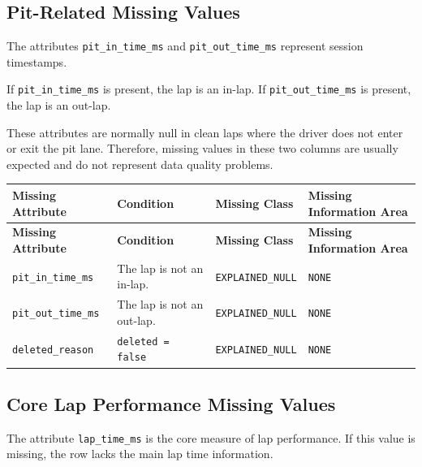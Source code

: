 \documentclass[a4paper,11pt]{article}
\begin{document}
	\subsection{Pit-Related Missing Values}
	
	The attributes \texttt{pit\_in\_time\_ms} and \texttt{pit\_out\_time\_ms} represent session timestamps.
	
	If \texttt{pit\_in\_time\_ms} is present, the lap is an in-lap.
	If \texttt{pit\_out\_time\_ms} is present, the lap is an out-lap.
	
	These attributes are normally null in clean laps where the driver does not enter or exit the pit lane.
	Therefore, missing values in these two columns are usually expected and do not represent data quality problems.
	
	\begin{longtable}{p{4cm}p{4.5cm}p{3.5cm}p{4cm}}
		\toprule
		\textbf{Missing Attribute} & \textbf{Condition} & \textbf{Missing Class} & \textbf{Missing Information Area} \\
		\midrule
		\endfirsthead
		
		\toprule
		\textbf{Missing Attribute} & \textbf{Condition} & \textbf{Missing Class} & \textbf{Missing Information Area} \\
		\midrule
		\endhead
		
		\texttt{pit\_in\_time\_ms}
		& The lap is not an in-lap.
		& \texttt{EXPLAINED\_NULL}
		& \texttt{NONE} \\
		\midrule
		
		\texttt{pit\_out\_time\_ms}
		& The lap is not an out-lap.
		& \texttt{EXPLAINED\_NULL}
		& \texttt{NONE} \\
		\midrule
		
		\texttt{deleted\_reason}
		& \texttt{deleted = false}
		& \texttt{EXPLAINED\_NULL}
		& \texttt{NONE} \\
		\bottomrule
	\end{longtable}
	
	\subsection{Core Lap Performance Missing Values}
	
	The attribute \texttt{lap\_time\_ms} is the core measure of lap performance.
	If this value is missing, the row lacks the main lap time information.
\end{document}
